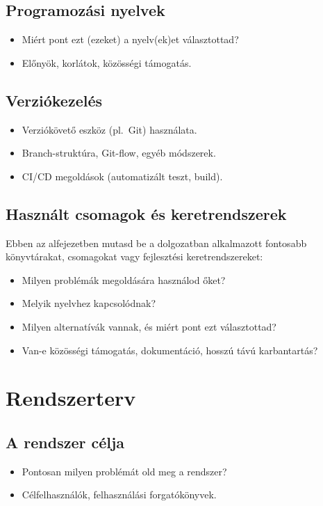 \documentclass{thesis-ekf}
\begin{document}
\section{Programozási nyelvek}
\begin{itemize}
  \item Miért pont ezt (ezeket) a nyelv(ek)et választottad?
  \item Előnyök, korlátok, közösségi támogatás.
\end{itemize}

\section{Verziókezelés}
\begin{itemize}
  \item Verziókövető eszköz (pl.\ Git) használata.
  \item Branch-struktúra, Git-flow, egyéb módszerek.
  \item CI/CD megoldások (automatizált teszt, build).
\end{itemize}

\section{Használt csomagok és keretrendszerek}
Ebben az alfejezetben mutasd be a dolgozatban alkalmazott fontosabb könyvtárakat, csomagokat vagy fejlesztési keretrendszereket:
\begin{itemize}
  \item Milyen problémák megoldására használod őket?
  \item Melyik nyelvhez kapcsolódnak?
  \item Milyen alternatívák vannak, és miért pont ezt választottad?
  \item Van-e közösségi támogatás, dokumentáció, hosszú távú karbantartás?
\end{itemize}

\chapter{Rendszerterv}

\section{A rendszer célja}
\begin{itemize}
  \item Pontosan milyen problémát old meg a rendszer?
  \item Célfelhasználók, felhasználási forgatókönyvek.
\end{itemize}
\end{document}
